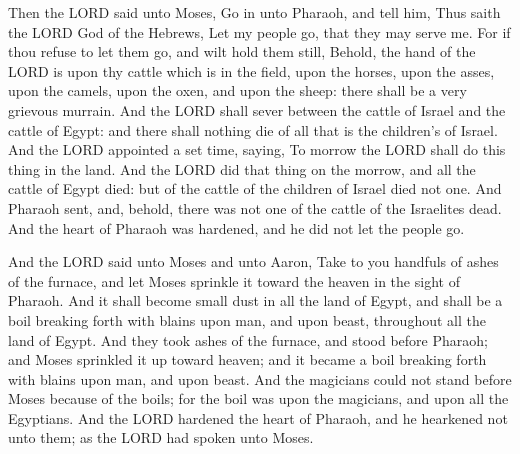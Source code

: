 Then the LORD said unto Moses, Go in unto Pharaoh, and tell
him, Thus saith the LORD God of the Hebrews, Let my people go, that they
may serve me.  For if thou refuse to let them go, and wilt
hold them still,  Behold, the hand of the LORD is upon thy
cattle which is in the field, upon the horses, upon the asses, upon the
camels, upon the oxen, and upon the sheep: there shall be a very
grievous murrain.  And the LORD shall sever between the
cattle of Israel and the cattle of Egypt: and there shall nothing die of
all that is the children's of Israel.  And the LORD
appointed a set time, saying, To morrow the LORD shall do this thing in
the land.  And the LORD did that thing on the morrow, and
all the cattle of Egypt died: but of the cattle of the children of
Israel died not one.  And Pharaoh sent, and, behold, there
was not one of the cattle of the Israelites dead. And the heart of
Pharaoh was hardened, and he did not let the people go.

 And the LORD said unto Moses and unto Aaron, Take to you
handfuls of ashes of the furnace, and let Moses sprinkle it toward the
heaven in the sight of Pharaoh.  And it shall become small
dust in all the land of Egypt, and shall be a boil breaking forth with
blains upon man, and upon beast, throughout all the land of Egypt.
 And they took ashes of the furnace, and stood before
Pharaoh; and Moses sprinkled it up toward heaven; and it became a boil
breaking forth with blains upon man, and upon beast.  And
the magicians could not stand before Moses because of the boils; for the
boil was upon the magicians, and upon all the Egyptians. 
And the LORD hardened the heart of Pharaoh, and he hearkened not unto
them; as the LORD had spoken unto Moses.

